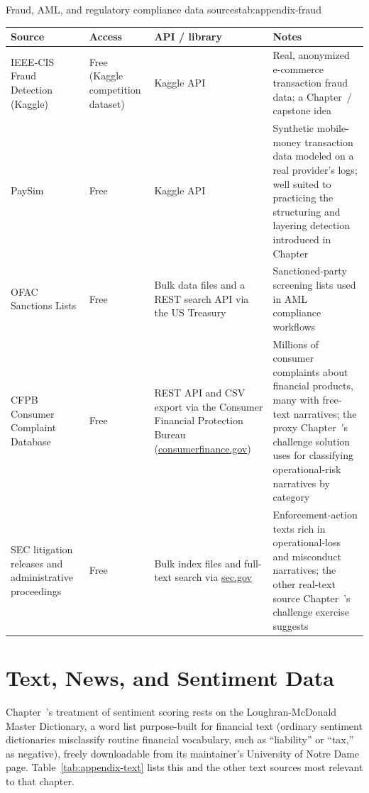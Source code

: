 \documentclass[../ai_in_finance]{subfiles}
\begin{document}
\begin{booktable}[htbp]{Fraud, AML, and regulatory compliance data sources}{tab:appendix-fraud}
\begin{tabular}{L{3.4cm}L{2.2cm}L{3.6cm}L{3.4cm}}
\toprule
Source & Access & API / library & Notes \\
\midrule
IEEE-CIS Fraud Detection (Kaggle) & Free (Kaggle competition dataset) & Kaggle API & Real, anonymized e-commerce transaction fraud data; a Chapter~/ capstone idea \\
PaySim & Free & Kaggle API & Synthetic mobile-money transaction data modeled on a real provider's logs; well suited to practicing the structuring and layering detection introduced in Chapter~ \\
OFAC Sanctions Lists & Free & Bulk data files and a REST search API via the US Treasury & Sanctioned-party screening lists used in AML compliance workflows \\
CFPB Consumer Complaint Database & Free & REST API and CSV export via the Consumer Financial Protection Bureau (\url{consumerfinance.gov}) & Millions of consumer complaints about financial products, many with free-text narratives; the proxy Chapter~'s challenge solution uses for classifying operational-risk narratives by category \\
SEC litigation releases and administrative proceedings & Free & Bulk index files and full-text search via \url{sec.gov} & Enforcement-action texts rich in operational-loss and misconduct narratives; the other real-text source Chapter~'s challenge exercise suggests \\
\bottomrule
\end{tabular}
\end{booktable}

\section{Text, News, and Sentiment Data}

Chapter~'s treatment of sentiment scoring rests on the Loughran-McDonald Master Dictionary, a word list purpose-built for financial text (ordinary sentiment dictionaries misclassify routine financial vocabulary, such as ``liability'' or ``tax,'' as negative), freely downloadable from its maintainer's University of Notre Dame page. Table~\ref{tab:appendix-text} lists this and the other text sources most relevant to that chapter.
\end{document}
